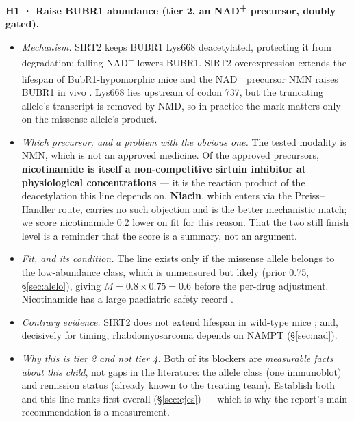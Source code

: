 \documentclass[10pt]{article}
\begin{document}
\textbf{H1 · Raise BUBR1 abundance (tier 2, an NAD\textsuperscript{+} precursor, doubly gated).}
\begin{itemize}
\item \textit{Mechanism.} SIRT2 keeps BUBR1 Lys668 deacetylated, protecting it from degradation; falling
  NAD\textsuperscript{+} lowers BUBR1. SIRT2 overexpression extends the lifespan of BubR1-hypomorphic mice and the
  NAD\textsuperscript{+} precursor NMN raises BUBR1 in vivo \citep{north}. Lys668 lies upstream of codon 737, but the
  truncating allele's transcript is removed by NMD, so in practice the mark matters only on the missense allele's
  product.
\item \textit{Which precursor, and a problem with the obvious one.} The tested modality is NMN, which is not an
  approved medicine. Of the approved precursors, \textbf{nicotinamide is itself a non-competitive sirtuin inhibitor
  at physiological concentrations} \citep{bitterman} --- it is the reaction product of the deacetylation this line
  depends on. \textbf{Niacin}, which enters via the Preiss--Handler route, carries no such objection and is the
  better mechanistic match; we score nicotinamide 0.2 lower on fit for this reason. That the two still finish level
  is a reminder that the score is a summary, not an argument.
\item \textit{Fit, and its condition.} The line exists only if the missense allele belongs to the low-abundance
  class, which is unmeasured but likely (prior 0.75, §\ref{sec:alelo}), giving $M = 0.8 \times 0.75 = 0.6$ before
  the per-drug adjustment. Nicotinamide has a large paediatric safety record \citep{gale,knip}.
\item \textit{Contrary evidence.} SIRT2 does not extend lifespan in wild-type mice \citep{wu}; and, decisively for
  timing, rhabdomyosarcoma depends on NAMPT (§\ref{sec:nad}).
\item \textit{Why this is tier 2 and not tier 4.} Both of its blockers are \emph{measurable facts about this child},
  not gaps in the literature: the allele class (one immunoblot) and remission status (already known to the treating
  team). Establish both and this line ranks first overall (§\ref{sec:ejes}) --- which is why the report's main
  recommendation is a measurement.
\end{itemize}
\end{document}
